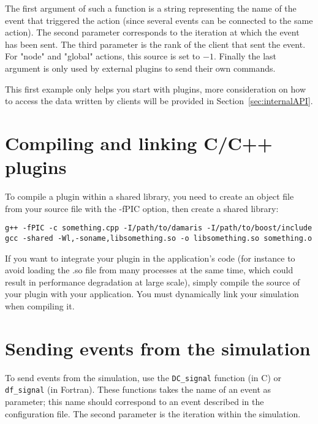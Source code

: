 \documentclass[11pt]{report}
\newcommand{\function}[1]{\texttt{#1}}
\begin{document}
The first argument of such a function is a string representing the name of the event that triggered
the action (since several events can be connected to the same action). The second parameter
corresponds to the iteration at which the event has been sent. The third parameter is the rank
of the client that sent the event. For "node" and "global" actions, this source is set to $-1$.
Finally the last argument is only used by external plugins to send their own commands.

This first example only helps you start with plugins, more consideration on how to
access the data written by clients will be provided in Section~\ref{sec:internalAPI}.

\section{Compiling and linking C/C++ plugins}

To compile a plugin within a shared library, 
you need to create an object file from your source file with the -fPIC option,
then create a shared library:
\begin{verbatim}
g++ -fPIC -c something.cpp -I/path/to/damaris -I/path/to/boost/include
gcc -shared -Wl,-soname,libsomething.so -o libsomething.so something.o
\end{verbatim}

If you want to integrate your plugin in the application's code (for instance to avoid
loading the .so file from many processes at the same time, which could result in performance
degradation at large scale), simply compile the source of your plugin with your application. You must
dynamically link your simulation when compiling it.


\section{Sending events from the simulation}

To send events from the simulation, use the \function{DC\_signal} function (in C) or \function{df\_signal}
(in Fortran). These functions takes the name of an event as parameter; this name should correspond to
an event described in the configuration file. The second parameter is the iteration within the simulation.
\end{document}
